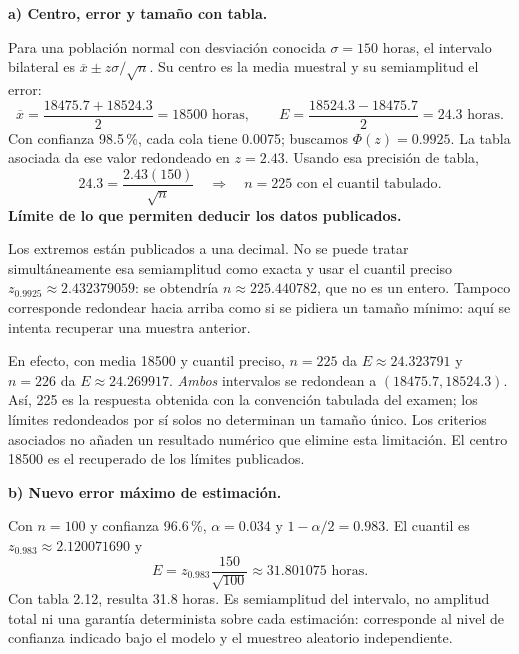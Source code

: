 \textbf{a) Centro, error y tamaño con tabla.}\par\nopagebreak[4]
Para una población normal con desviación conocida $\sigma=150$ horas, el intervalo bilateral es $\overline x\pm z\sigma/\sqrt n$. Su centro es la media muestral y su semiamplitud el error:
\[
\boxed{\overline x=\frac{18475.7+18524.3}{2}=18500\text{ horas}},
\qquad E=\frac{18524.3-18475.7}{2}=24.3\text{ horas}.
\]
Con confianza 98.5\,\%, cada cola tiene 0.0075; buscamos $\Phi(z)=0.9925$. La tabla asociada da ese valor redondeado en $z=2.43$. Usando esa precisión de tabla,
\[
24.3=\frac{2.43(150)}{\sqrt n}
\quad\Longrightarrow\quad\boxed{n=225\text{ con el cuantil tabulado}.}
\]
\textbf{Límite de lo que permiten deducir los datos publicados.}\par\nopagebreak[4]
Los extremos están publicados a una decimal. No se puede tratar simultáneamente esa semiamplitud como exacta y usar el cuantil preciso $z_{0.9925}\approx2.432379059$: se obtendría $n\approx225.440782$, que no es un entero. Tampoco corresponde redondear hacia arriba como si se pidiera un tamaño mínimo: aquí se intenta recuperar una muestra anterior.

En efecto, con media 18500 y cuantil preciso, $n=225$ da $E\approx24.323791$ y $n=226$ da $E\approx24.269917$. \emph{Ambos} intervalos se redondean a $(18475.7,18524.3)$. Así, 225 es la respuesta obtenida con la convención tabulada del examen; los límites redondeados por sí solos no determinan un tamaño único. Los criterios asociados no añaden un resultado numérico que elimine esta limitación. El centro 18500 es el recuperado de los límites publicados.

\textbf{b) Nuevo error máximo de estimación.}\par\nopagebreak[4]
Con $n=100$ y confianza 96.6\,\%, $\alpha=0.034$ y $1-\alpha/2=0.983$. El cuantil es $z_{0.983}\approx2.120071690$ y
\[
\boxed{E=z_{0.983}\frac{150}{\sqrt{100}}\approx31.801075\text{ horas}.}
\]
Con tabla 2.12, resulta 31.8 horas. Es semiamplitud del intervalo, no amplitud total ni una garantía determinista sobre cada estimación: corresponde al nivel de confianza indicado bajo el modelo y el muestreo aleatorio independiente.
